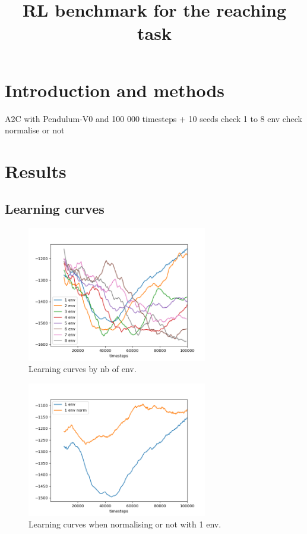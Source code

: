 \documentclass{article}
\title{RL benchmark for the reaching task}
\date{}
\begin{document}
\maketitle


\section{Introduction and methods}

A2C with Pendulum-V0 and 100 000 timesteps + 10 seeds
check 1 to 8 env
check normalise or not

\section{Results}

\subsection{Learning curves}

\begin{figure}[H]
    \centering
    \includegraphics[width=0.7\textwidth]{../learning_curves_by_env.png}
\caption{Learning curves by nb of env.}
\end{figure}

\begin{figure}[H]
    \centering
    \includegraphics[width=0.7\textwidth]{../learning_curves_norm1.png}
\caption{Learning curves when normalising or not with 1 env.}
\end{figure}
\end{document}
